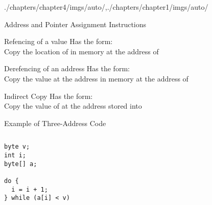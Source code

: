 \begin{graphicspathcontext}{{./chapters/chapter4/imgs/auto/},{./chapters/chapter1/imgs/auto/}}
\begin{bibunit}[apalike]
\begin{frame}{{Address and Pointer} Assignment Instructions}
	\begin{definitionblock}{Refencing of a value}
		Has the form: \emph{} \\
		Copy the location of  in memory at the address of 
	\end{definitionblock}
	\vspace{.5cm}
	\begin{definitionblock}{Derefencing of an address}
		Has the form: \emph{} \\
		Copy the value at the address  in memory at the address of 
	\end{definitionblock}
	\vspace{.5cm}
	\begin{definitionblock}{Indirect Copy}
		Has the form: \emph{} \\
		Copy the value of  at the address stored into 
	\end{definitionblock}
\end{frame}

\begin{frame}[fragile,background=6]{Example of Three-Address Code}
	\larger\larger
	\begin{columns}
		\begin{column}{.45\linewidth}
			\centering
			\begin{lstlisting}[style=lststyle-java,basicstyle=\normalsize]
byte v;
int i;
byte[] a;

do {
  i = i + 1;
} while (a[i] < v)
			\end{lstlisting}
		\end{column}
		\begin{column}{.1\linewidth}
			\centering
		\end{column}
		\begin{column}{.45\linewidth}
			\centering
			\begin{tac}[.5\linewidth]
			\end{tac}
		\end{column}
	\end{columns}
\end{frame}


\end{bibunit}
\end{graphicspathcontext}
